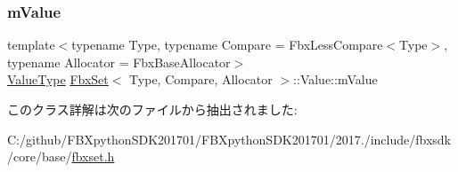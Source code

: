 \subsubsection{\texorpdfstring{m\+Value}{mValue}}
{\footnotesize\ttfamily template$<$typename Type, typename Compare = Fbx\+Less\+Compare$<$\+Type$>$, typename Allocator = Fbx\+Base\+Allocator$>$ \\
\hyperlink{class_fbx_set_1_1_value_aa4757d6676c438c18ab271c57997d8eb}{Value\+Type} \hyperlink{class_fbx_set}{Fbx\+Set}$<$ Type, Compare, Allocator $>$\+::Value\+::m\+Value\hspace{0.3cm}{\ttfamily [protected]}}



このクラス詳解は次のファイルから抽出されました\+:\begin{DoxyCompactItemize}
\item 
C\+:/github/\+F\+B\+Xpython\+S\+D\+K201701/\+F\+B\+Xpython\+S\+D\+K201701/2017./include/fbxsdk/core/base/\hyperlink{fbxset_8h}{fbxset.\+h}\end{DoxyCompactItemize}
